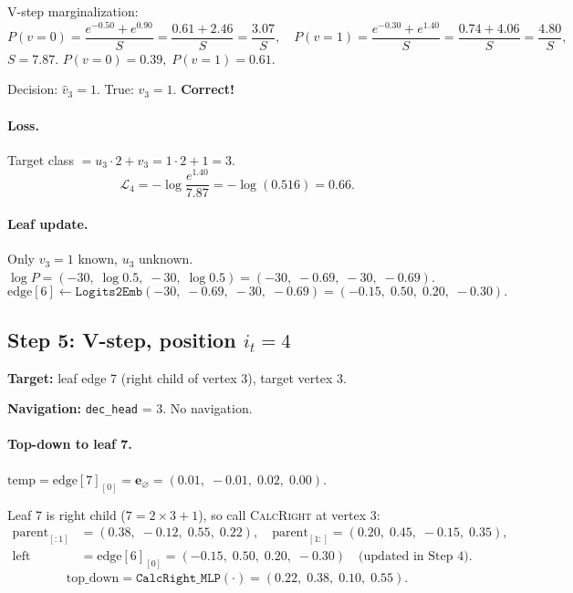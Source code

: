 \documentclass[11pt,a4paper]{article}
\newcommand{\noinf}{\mathbf{e}_{\varnothing}}
\newcommand{\calR}{\textsc{CalcRight}}
\begin{document}
V-step marginalization:
\[
P(v{=}0) = \frac{e^{-0.50} + e^{0.90}}{S} = \frac{0.61 + 2.46}{S} = \frac{3.07}{S}, \quad
P(v{=}1) = \frac{e^{-0.30} + e^{1.40}}{S} = \frac{0.74 + 4.06}{S} = \frac{4.80}{S},
\]
$S = 7.87$.  $P(v{=}0) = 0.39,\; P(v{=}1) = 0.61$.

Decision: $\hat{v}_3 = 1$.  True: $v_3 = 1$.  \textbf{Correct!}

\paragraph{Loss.}
Target class $= u_3 \cdot 2 + v_3 = 1 \cdot 2 + 1 = 3$.
\[
\mathcal{L}_4 = -\log \frac{e^{1.40}}{7.87} = -\log(0.516) = 0.66.
\]

\paragraph{Leaf update.}
Only $v_3 = 1$ known, $u_3$ unknown.  $\log P = (-30,\; \log 0.5,\; -30,\; \log 0.5) = (-30,\; -0.69,\; -30,\; -0.69)$.
\[
\text{edge}[6] \leftarrow \texttt{Logits2Emb}(-30,\; -0.69,\; -30,\; -0.69) = (-0.15,\; 0.50,\; 0.20,\; -0.30).
\]

\subsection{Step 5: V-step, position $i_t = 4$}

\textbf{Target:} leaf edge 7 (right child of vertex 3), target vertex 3.

\textbf{Navigation:} \texttt{dec\_head} = 3.  No navigation.

\paragraph{Top-down to leaf 7.}
$\text{temp} = \text{edge}[7]_{[0]} = \noinf = (0.01,\; -0.01,\; 0.02,\; 0.00)$.

Leaf 7 is right child ($7 = 2 \times 3 + 1$), so call \calR{} at vertex 3:
\begin{align*}
\text{parent}_{[:1]} &= (0.38,\; -0.12,\; 0.55,\; 0.22), \quad
\text{parent}_{[1:]} = (0.20,\; 0.45,\; -0.15,\; 0.35), \\
\text{left} &= \text{edge}[6]_{[0]} = (-0.15,\; 0.50,\; 0.20,\; -0.30) \quad \text{(updated in Step 4)}.
\end{align*}
\[
\text{top\_down} = \texttt{CalcRight\_MLP}(\cdot) = (0.22,\; 0.38,\; 0.10,\; 0.55).
\]
\end{document}
